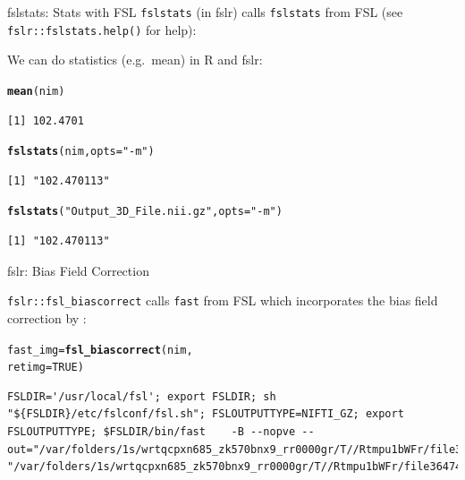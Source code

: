 \documentclass[11pt]{beamer}\usepackage[]{graphicx}\usepackage[]{color}
\makeatletter
\newcommand{\hlnum}[1]{\textcolor[rgb]{0.686,0.059,0.569}{#1}}%
\newcommand{\hlstr}[1]{\textcolor[rgb]{0.192,0.494,0.8}{#1}}%
\newcommand{\hlstd}[1]{\textcolor[rgb]{0.345,0.345,0.345}{#1}}%
\newcommand{\hlkwb}[1]{\textcolor[rgb]{0.69,0.353,0.396}{#1}}%
\newcommand{\hlkwc}[1]{\textcolor[rgb]{0.333,0.667,0.333}{#1}}%
\newcommand{\hlkwd}[1]{\textcolor[rgb]{0.737,0.353,0.396}{\textbf{#1}}}%
\newenvironment{kframe}{%
 \def\at@end@of@kframe{}%
 \ifinner\ifhmode%
  \def\at@end@of@kframe{\end{minipage}}%
  \begin{minipage}{\columnwidth}%
 \fi\fi%
 \def\FrameCommand##1{\hskip\@totalleftmargin \hskip-\fboxsep
 \colorbox{shadecolor}{##1}\hskip-\fboxsep
     \hskip-\linewidth \hskip-\@totalleftmargin \hskip\columnwidth}%
 \MakeFramed {\advance\hsize-\width
   \@totalleftmargin\z@ \linewidth\hsize
   \@setminipage}}%
 {\par\unskip\endMakeFramed%
 \at@end@of@kframe}
\newenvironment{knitrout}{}{} %
\makeatother
\begin{document}
\begin{frame}[fragile]{fslstats: Stats with FSL}
\verb|fslstats| (in fslr) calls \verb|fslstats| from FSL (see \verb|fslr::fslstats.help()| for help):

We can do statistics (e.g.~mean) in R and fslr:
\begin{knitrout}
\color{fgcolor}\begin{kframe}
\begin{alltt}
\hlkwd{mean}\hlstd{(nim)}
\end{alltt}
\begin{verbatim}
[1] 102.4701
\end{verbatim}
\begin{alltt}
\hlkwd{fslstats}\hlstd{(nim,} \hlkwc{opts}\hlstd{=}\hlstr{"-m"}\hlstd{)}
\end{alltt}
\begin{verbatim}
[1] "102.470113"
\end{verbatim}
\begin{alltt}
\hlkwd{fslstats}\hlstd{(}\hlstr{"Output_3D_File.nii.gz"}\hlstd{,} \hlkwc{opts} \hlstd{=} \hlstr{"-m"}\hlstd{)}
\end{alltt}
\begin{verbatim}
[1] "102.470113"
\end{verbatim}
\end{kframe}
\end{knitrout}


\end{frame}


\begin{frame}[fragile]{fslr: Bias Field Correction}

\verb|fslr::fsl_biascorrect| calls \verb|fast| from FSL which incorporates the bias field correction by \citet{guillemaud1997estimating}:

\begin{knitrout}
\color{fgcolor}\begin{kframe}
\begin{alltt}
\hlstd{fast_img} \hlkwb{=} \hlkwd{fsl_biascorrect}\hlstd{(nim,}
        \hlkwc{retimg}\hlstd{=}\hlnum{TRUE}\hlstd{)}
\end{alltt}
\begin{verbatim}
FSLDIR='/usr/local/fsl'; export FSLDIR; sh "${FSLDIR}/etc/fslconf/fsl.sh"; FSLOUTPUTTYPE=NIFTI_GZ; export FSLOUTPUTTYPE; $FSLDIR/bin/fast    -B --nopve --out="/var/folders/1s/wrtqcpxn685_zk570bnx9_rr0000gr/T//Rtmpu1bWFr/file36472b611ed9" "/var/folders/1s/wrtqcpxn685_zk570bnx9_rr0000gr/T//Rtmpu1bWFr/file3647404bb909.nii.gz"; 
\end{verbatim}
\end{kframe}
\end{knitrout}
\end{frame}
\end{document}
